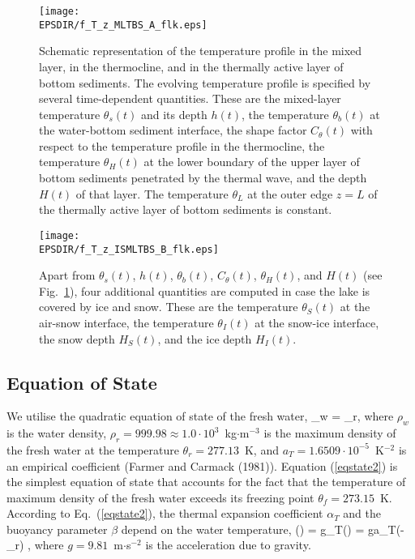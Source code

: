 %
\begin{figure} %
\begin{center}
\texttt{[image: \\EPSDIR/f\_T\_z\_MLTBS\_A\_flk.eps]}
\begin{minipage}{0.9\textwidth}
\caption{Schematic representation of the temperature profile
in the mixed layer, in the thermocline, 
and in the thermally active layer of bottom sediments.
The evolving temperature profile is specified by several time-dependent quantities. 
These are 
the mixed-layer temperature $\theta_s(t)$ and its depth $h(t)$,
the temperature $\theta_b(t)$ at the water-bottom sediment interface,
the shape factor $C_{\theta}(t)$ with respect to the temperature profile in the thermocline,
the temperature $\theta_H(t)$ at the lower boundary of the upper layer of bottom sediments
penetrated by the thermal wave, and the depth $H(t)$ of that layer.
The temperature $\theta_{L}$ at the outer edge $z=L$
of the thermally active layer of bottom sediments is constant.}
\label{ftr_T_sch_2media}
\end{minipage}
\end{center}
\end{figure}
%
%
\begin{figure} %
\begin{center}
\texttt{[image: \\EPSDIR/f\_T\_z\_ISMLTBS\_B\_flk.eps]}
\begin{minipage}{0.9\textwidth}
\caption{
Apart from $\theta_s(t)$, $h(t)$, $\theta_b(t)$, $C_{\theta}(t)$, $\theta_H(t)$, and $H(t)$   
(see Fig.~\ref{ftr_T_sch_2media}), 
four additional quantities are computed in case the lake is covered by ice and snow. 
These are 
the temperature $\theta_S(t)$ at the air-snow interface,
the temperature $\theta_I(t)$ at the snow-ice interface,
the snow depth $H_S(t)$, and the ice depth $H_I(t)$.}
\label{ftr_T_sch_4media}
\end{minipage}
\end{center}
\end{figure}
%


\subsection{Equation of State}\label{eqstate}
\nopagebreak 
%
\noindent
We utilise the quadratic equation of state of the fresh water, 
%
\beq\label{eqstate2}
\rho_w = \rho_r ,
\eeq
%
where $\rho_w$ is the water density, 
$\rho_r=999.98\approx1.0\cdot10^3$~kg$\cdot$m$^{-3}$ is the maximum density 
of the fresh water at the temperature $\theta_r=277.13$~K, 
and $a_T=1.6509\cdot 10^{-5}$~K$^{-2}$ is an empirical 
coefficient (Farmer and Carmack (1981)\nocite{farmer1981}). 
Equation (\ref{eqstate2}) is the simplest equation of state that 
accounts for the fact that the temperature of maximum density of 
the fresh water exceeds its freezing point 
$\theta_f=273.15$~K. 
According to Eq.~(\ref{eqstate2}), 
the thermal expansion coefficient 
$\alpha_T$ and the buoyancy parameter $\beta$ 
depend on the water temperature, 
%
\beq\label{buopar}
\beta(\theta) = g\alpha_T(\theta) = ga_T(\theta-\theta_r) ,
\eeq
%
where $g=9.81$~m$\cdot$s$^{-2}$ is the acceleration due to gravity.


